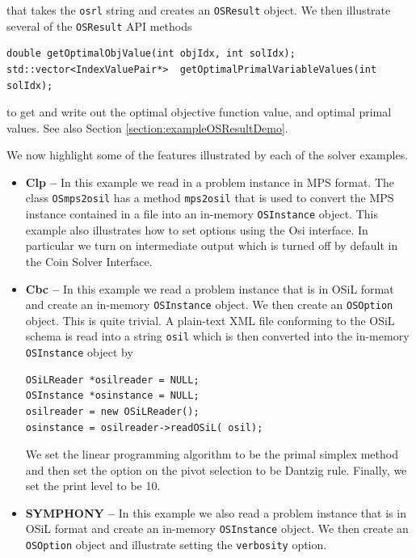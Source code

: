 \documentclass[11pt]{article}
\renewcommand{\_}{{\char"5F}}
\renewcommand{\{}{{\char"7B}}
\renewcommand{\}}{{\char"7D}}
\renewcommand{\^}{{\char"0D}}
\renewcommand{\'}{{\char"0D}}
\begin{document}
\begin{enumerate}[Step 1:]
\begin{itemize}
that takes the {\tt osrl} string and creates an {\tt OSResult} object.   
We then illustrate several of the {\tt OSResult} API methods 

\begin{verbatim}
double getOptimalObjValue(int objIdx, int solIdx);
std::vector<IndexValuePair*>  getOptimalPrimalVariableValues(int solIdx);
\end{verbatim}
to get and write out the optimal objective function value, and optimal primal values.  See also Section \ref{section:exampleOSResultDemo}.

\end{itemize}

We now highlight some of the features illustrated by each of the solver examples.

\begin{itemize}
\item {\bf Clp --}  In this example we read in a problem instance in MPS format.  The class 
{\tt OSmps2osil}  has a method {\tt mps2osil} that is used to convert the MPS instance contained 
in a file into an in-memory {\tt OSInstance} object. This example also illustrates how to 
set options using the Osi interface. In particular we turn on intermediate output which is 
turned off by default in the Coin Solver Interface. 

\item {\bf Cbc --}  In this example we read a problem instance that is in OSiL format and create 
an in-memory {\tt OSInstance} object.  We then create an {\tt OSOption} object.  This is quite trivial.  
A  plain-text XML file conforming to the OSiL schema is read into a string {\tt osil} which is then 
converted into the in-memory {\tt OSInstance} object by

\begin{verbatim}
OSiLReader *osilreader = NULL;
OSInstance *osinstance = NULL;
osilreader = new OSiLReader(); 
osinstance = osilreader->readOSiL( osil);
\end{verbatim}


 We set the linear programming algorithm to be the primal simplex method and then set the option 
on the pivot selection to be Dantzig rule.  Finally, we set the print level to be 10.

\item {\bf SYMPHONY --}   In this example we also read a problem instance that is in OSiL format and 
create an in-memory {\tt OSInstance} object.  We then create an {\tt OSOption} object and 
illustrate setting the {\tt verbosity} option.


\end{itemize}
\end{enumerate}
\end{document}
